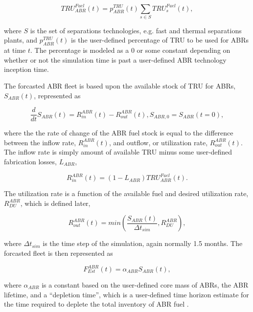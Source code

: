 \begin{equation*}
 TRU^{Fuel}_{ABR}(t) = p^{TRU}_{ABR}(t) \sum_{s \in S} TRU^{Fuel}_s(t),
\end{equation*}

where $S$ is the set of separations technologies, e.g. fast and thermal
separations plants, and $p^{TRU}_{ABR}(t)$ is the user-defined percentage of TRU
to be used for ABRs at time $t$. The percentage is modeled as a 0 or some
constant depending on whether or not the simulation time is past a user-defined
ABR technology inception time. 

The forcasted ABR fleet is based upon the available stock of TRU for ABRs,
$S_{ABR}(t)$, represented as

\begin{equation*}
 \frac{d}{dt}S_{ABR}(t) = R_{in}^{ABR}(t) - R_{out}^{ABR}(t), S_{ABR,0} = S_{ABR}(t=0),
\end{equation*}

where the the rate of change of the ABR fuel stock is equal to the difference
between the inflow rate, $R_{in}^{ABR}(t)$, and outflow, or utilization rate,
$R_{out}^{ABR}(t)$. The inflow rate is simply amount of available TRU minus some
user-defined fabrication losses, $L_{ABR}$,

\begin{equation*}
 R_{in}^{ABR}(t) = \left( 1 - L_{ABR} \right) TRU^{Fuel}_{ABR}(t).
\end{equation*}

The utilization rate is a function of the available fuel and desired utilization
rate, $R^{ABR}_{DU}$, which is defined later,

\begin{equation*}
 R_{out}^{ABR}(t) = min \left( \frac{S_{ABR}(t)}{\Delta t_{sim}}, R^{ABR}_{DU}\right),
\end{equation*}

where $\Delta t_{sim}$ is the time step of the simulation, again normally 1.5
months. The forcasted fleet is then represented as

\begin{equation*}
 F_{Est}^{ABR}(t) = \alpha_{ABR} S_{ABR}(t),
\end{equation*}

where $\alpha_{ABR}$ is a constant based on the user-defined core mass of ABRs,
the ABR lifetime, and a ``depletion time'', which is a user-defined time horizon
estimate for the time required to deplete the total inventory of ABR
fuel \cite{busquim_e_silva_system_2008}.

